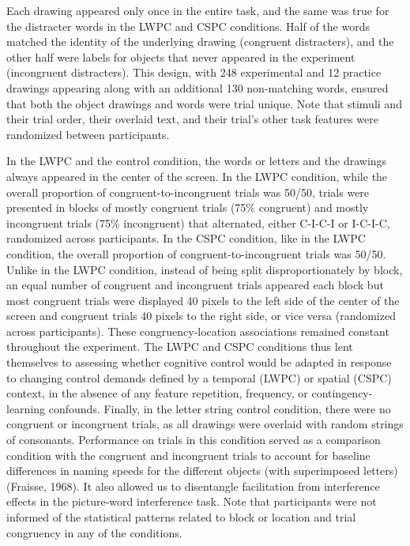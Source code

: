 \documentclass[
  ,man,floatsintext]{apa6}
\begin{document}
Each drawing appeared only once in the entire task, and the same was true for the distracter words in the LWPC and CSPC conditions. Half of the words matched the identity of the underlying drawing (congruent distracters), and the other half were labels for objects that never appeared in the experiment (incongruent distracters). This design, with 248 experimental and 12 practice drawings appearing along with an additional 130 non-matching words, ensured that both the object drawings and words were trial unique. Note that stimuli and their trial order, their overlaid text, and their trial's other task features were randomized between participants.

In the LWPC and the control condition, the words or letters and the drawings always appeared in the center of the screen. In the LWPC condition, while the overall proportion of congruent-to-incongruent trials was 50/50, trials were presented in blocks of mostly congruent trials (75\% congruent) and mostly incongruent trials (75\% incongruent) that alternated, either C-I-C-I or I-C-I-C, randomized across participants. In the CSPC condition, like in the LWPC condition, the overall proportion of congruent-to-incongruent trials was 50/50. Unlike in the LWPC condition, instead of being split disproportionately by block, an equal number of congruent and incongruent trials appeared each block but most congruent trials were displayed 40 pixels to the left side of the center of the screen and congruent trials 40 pixels to the right side, or vice versa (randomized across participants). These congruency-location associations remained constant throughout the experiment. The LWPC and CSPC conditions thus lent themselves to assessing whether cognitive control would be adapted in response to changing control demands defined by a temporal (LWPC) or spatial (CSPC) context, in the absence of any feature repetition, frequency, or contingency-learning confounds. Finally, in the letter string control condition, there were no congruent or incongruent trials, as all drawings were overlaid with random strings of consonants. Performance on trials in this condition served as a comparison condition with the congruent and incongruent trials to account for baseline differences in naming speeds for the different objects (with superimposed letters) (Fraisse, 1968). It also allowed us to disentangle facilitation from interference effects in the picture-word interference task. Note that participants were not informed of the statistical patterns related to block or location and trial congruency in any of the conditions.
\end{document}
